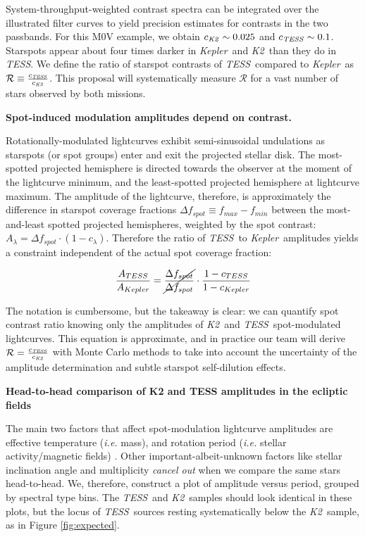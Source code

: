 \documentclass[modern]{aastex631}
\newcommand{\tess}{{\it TESS}}
\newcommand{\kepler}{{\it Kepler}}
\newcommand{\ktwo}{{\it K2}}
\begin{document}
System-throughput-weighted contrast spectra can be integrated over the illustrated filter curves to yield precision estimates for contrasts in the two passbands.  For this M0V example, we obtain $c_{\ktwo}\sim0.025$ and $c_{\tess}\sim0.1$.  Starspots appear about four times darker in \kepler\ and \ktwo\ than they do in \tess.  We define the ratio of starspot contrasts of \tess\ compared to \kepler\ as $\mathcal{R}\equiv \frac{c_{\tess}}{c_{\ktwo}}$.  This proposal will systematically measure $\mathcal{R}$ for a vast number of stars observed by both missions.

\noindent \textbf{Spot-induced modulation amplitudes depend on contrast.}

Rotationally-modulated lightcurves exhibit semi-sinusoidal undulations as starspots (or spot groups) enter and exit the projected stellar disk.  The most-spotted projected hemisphere is directed towards the observer at the moment of the lightcurve minimum, and the least-spotted projected hemisphere at lightcurve maximum.  The amplitude of the lightcurve, therefore, is approximately the difference in starspot coverage fractions $\Delta f_{spot} \equiv f_{max}-f_{min}$ between the most-and-least spotted projected hemispheres, weighted by the spot contrast: $ A_\lambda = \Delta f_{spot} \cdot (1-c_\lambda)$.  Therefore the ratio of \tess\ to \kepler\ amplitudes yields a constraint independent of the actual spot coverage fraction:

$$ \frac{A_{TESS}}{A_{Kepler}} = \cancel{\frac{\Delta f_{spot}}{\Delta f_{spot}}} \cdot \frac{1-c_{TESS}}{1-c_{Kepler}} $$

The notation is cumbersome, but the takeaway is clear: we can quantify spot contrast ratio knowing only the amplitudes of \ktwo\ and \tess\ spot-modulated lightcurves.  This equation is approximate, and in practice our team will derive $\mathcal{R}= \frac{c_{\tess}}{c_{\ktwo}}$ with Monte Carlo methods to take into account the uncertainty of the amplitude determination and subtle starspot self-dilution effects.
\newline

\noindent \textbf{Head-to-head comparison of K2 and TESS amplitudes in the ecliptic fields}



The main two factors that affect spot-modulation lightcurve amplitudes are effective temperature (\emph{i.e.} mass), and rotation period (\emph{i.e.} stellar activity/magnetic fields) \cite{2014ApJS..211...24M}.  Other important-albeit-unknown factors like stellar inclination angle and multiplicity \emph{cancel out} when we compare the same stars head-to-head.  We, therefore, construct a plot of amplitude versus period, grouped by spectral type bins.  The \tess\ and \ktwo\ samples should look identical in these plots, but the locus of \tess\ sources resting systematically below the \ktwo\ sample, as in Figure \ref{fig:expected}.
\end{document}
